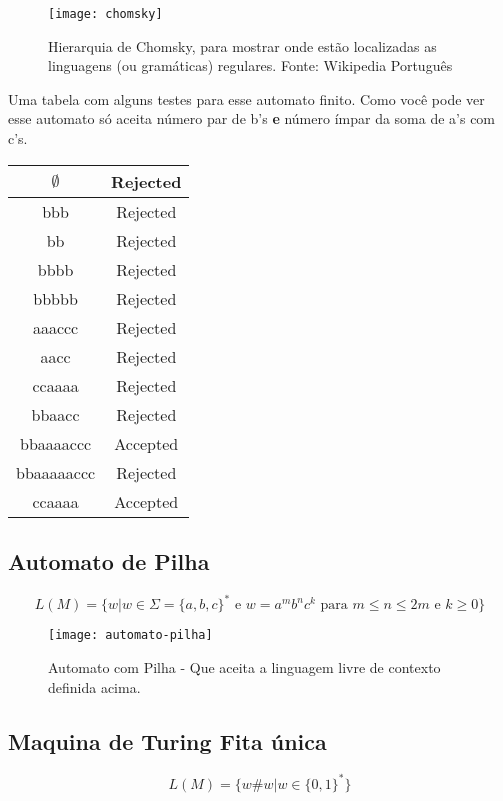 \documentclass[12pt, a4paper]{article}
\begin{document}
\begin{figure}[ht]
\centering
\texttt{[image: chomsky]}
\caption{Hierarquia de Chomsky, para mostrar onde estão localizadas as linguagens (ou gramáticas) regulares. Fonte: Wikipedia Português}
\end{figure}


\qquad Uma tabela com alguns testes para esse automato finito. Como você pode ver esse automato só aceita número par de b's \textbf{e} número ímpar da soma de a's com c's.

\begin{tabular}{|c|c|}
\hline
$\emptyset$ & Rejected \\
\hline
bbb & Rejected \\
\hline
bb & Rejected \\
\hline
bbbb & Rejected \\
\hline
bbbbb & Rejected \\
\hline
aaaccc & Rejected \\
\hline
aacc & Rejected \\
\hline
ccaaaa & Rejected \\
\hline
bbaacc & Rejected \\
\hline
bbaaaaccc & Accepted \\
\hline
bbaaaaaccc & Rejected \\
\hline
ccaaaa & Accepted \\
\hline
\end{tabular}

\pagebreak
\subsection{Automato de Pilha}

$$ L(M)= \lbrace w \vert w \in \Sigma =  {\lbrace a,b,c \rbrace}^* \text{ e } w = {{a}^m}{{b}^n}{{c}^k} \text{ para } m \leqslant n  \leqslant 2m \text{ e } k \geqslant 0 \rbrace $$


\begin{figure}[ht]
\centering
\texttt{[image: automato-pilha]}
\caption{Automato com Pilha - Que aceita a linguagem livre de contexto definida acima.}
\end{figure}

\pagebreak
\subsection{Maquina de Turing Fita única}

$$ L(M)= \lbrace w \# w \vert w \in  {\lbrace 0,1 \rbrace}^* \rbrace $$
\end{document}
